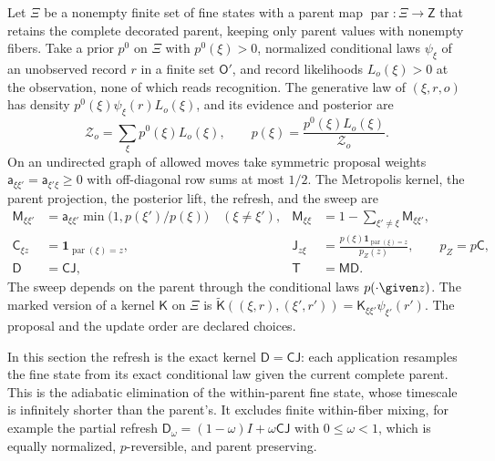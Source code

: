 Let $\Xi$ be a nonempty finite set of fine states with a parent map
$\operatorname{par}:\Xi\to\mathsf Z$ that retains the complete decorated parent,
keeping only parent values with nonempty fibers. Take a prior $p^0$ on $\Xi$
with $p^0(\xi)>0$, normalized conditional laws $\psi_\xi$ of an unobserved record
$r$ in a finite set $\mathsf O'$, and record likelihoods $L_o(\xi)>0$ at the
observation, none of which reads recognition. The generative law of $(\xi,r,o)$
has density $p^0(\xi)\psi_\xi(r)L_o(\xi)$, and its evidence and posterior are
\begin{equation}
\mathcal Z_o=\sum_\xi p^0(\xi)L_o(\xi),
\qquad
p(\xi)=\frac{p^0(\xi)L_o(\xi)}{\mathcal Z_o}.
\label{eq:rg-memory-target}
\end{equation}
On an undirected graph of allowed moves take symmetric proposal weights
$\mathsf a_{\xi\xi'}=\mathsf a_{\xi'\xi}\geq0$ with off-diagonal row sums at most
$1/2$. The Metropolis kernel, the parent projection, the posterior lift, the
refresh, and the sweep are
\begin{equation}
\begin{aligned}
\mathsf M_{\xi\xi'}&=\mathsf a_{\xi\xi'}\min\bigl(1,p(\xi')/p(\xi)\bigr)\quad(\xi\ne\xi'),
&\mathsf M_{\xi\xi}&=1-\sum_{\xi'\ne\xi}\mathsf M_{\xi\xi'},\\
\mathsf C_{\xi z}&=\mathbf 1_{\operatorname{par}(\xi)=z},
&\mathsf J_{z\xi}&=\frac{p(\xi)\mathbf 1_{\operatorname{par}(\xi)=z}}{p_Z(z)},
\qquad p_Z=p\mathsf C,\\
\mathsf D&=\mathsf C\mathsf J,
&\mathsf T&=\mathsf M\mathsf D.
\end{aligned}
\label{eq:rg-memory-sweep}
\end{equation}
The sweep depends on the parent through the conditional laws $p(\cdot\given z)$. The
marked version of a kernel $\mathsf K$ on
$\Xi$ is $\widetilde{\mathsf K}((\xi,r),(\xi',r'))=\mathsf K_{\xi\xi'}\psi_{\xi'}(r')$.
The proposal and the update order are declared choices.

In this section the refresh is the exact kernel $\mathsf D=\mathsf C\mathsf J$:
each application resamples the fine state from its exact conditional law given
the current complete parent. This is the adiabatic elimination of the
within-parent fine state, whose timescale is infinitely shorter than the parent's.
It excludes finite
within-fiber mixing, for example the partial refresh
$\mathsf D_\omega=(1-\omega)I+\omega\mathsf C\mathsf J$ with $0\leq\omega<1$, which
is equally normalized, $p$-reversible, and parent preserving.

